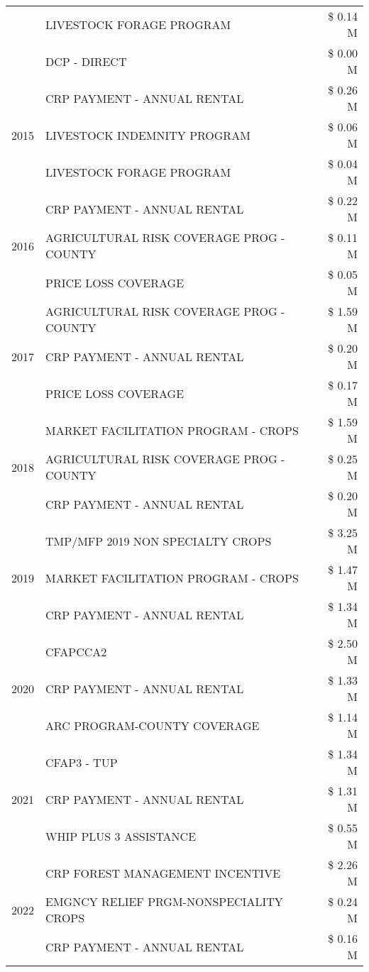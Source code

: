 \begin{tabular}{llr}
 & LIVESTOCK FORAGE PROGRAM & \$ 0.14 M \\
 & DCP - DIRECT & \$ 0.00 M \\
\cline{1-3}
\multirow[t]{3}{*}{2015} & CRP PAYMENT - ANNUAL RENTAL & \$ 0.26 M \\
 & LIVESTOCK INDEMNITY PROGRAM & \$ 0.06 M \\
 & LIVESTOCK FORAGE PROGRAM & \$ 0.04 M \\
\cline{1-3}
\multirow[t]{3}{*}{2016} & CRP PAYMENT - ANNUAL RENTAL & \$ 0.22 M \\
 & AGRICULTURAL RISK COVERAGE PROG - COUNTY & \$ 0.11 M \\
 & PRICE LOSS COVERAGE & \$ 0.05 M \\
\cline{1-3}
\multirow[t]{3}{*}{2017} & AGRICULTURAL RISK COVERAGE PROG - COUNTY & \$ 1.59 M \\
 & CRP PAYMENT - ANNUAL RENTAL & \$ 0.20 M \\
 & PRICE LOSS COVERAGE & \$ 0.17 M \\
\cline{1-3}
\multirow[t]{3}{*}{2018} & MARKET FACILITATION PROGRAM - CROPS & \$ 1.59 M \\
 & AGRICULTURAL RISK COVERAGE PROG - COUNTY & \$ 0.25 M \\
 & CRP PAYMENT - ANNUAL RENTAL & \$ 0.20 M \\
\cline{1-3}
\multirow[t]{3}{*}{2019} & TMP/MFP 2019 NON SPECIALTY CROPS & \$ 3.25 M \\
 & MARKET FACILITATION PROGRAM - CROPS & \$ 1.47 M \\
 & CRP PAYMENT - ANNUAL RENTAL & \$ 1.34 M \\
\cline{1-3}
\multirow[t]{3}{*}{2020} & CFAPCCA2 & \$ 2.50 M \\
 & CRP PAYMENT - ANNUAL RENTAL & \$ 1.33 M \\
 & ARC PROGRAM-COUNTY COVERAGE & \$ 1.14 M \\
\cline{1-3}
\multirow[t]{3}{*}{2021} & CFAP3 - TUP & \$ 1.34 M \\
 & CRP PAYMENT - ANNUAL RENTAL & \$ 1.31 M \\
 & WHIP PLUS 3 ASSISTANCE & \$ 0.55 M \\
\cline{1-3}
\multirow[t]{3}{*}{2022} & CRP FOREST MANAGEMENT INCENTIVE & \$ 2.26 M \\
 & EMGNCY RELIEF PRGM-NONSPECIALITY CROPS & \$ 0.24 M \\
 & CRP PAYMENT - ANNUAL RENTAL & \$ 0.16 M \\
\cline{1-3}
\bottomrule
\end{tabular}
